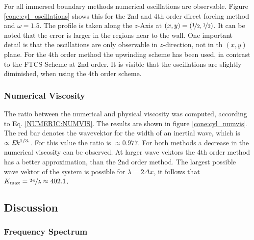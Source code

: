 For all immersed boundary methods numerical oscillations are observable.
Figure \ref{cone:cyl_oscillations} shows this for the 2nd and 4th order direct forcing method and $\omega=1.5$.
The profile is taken along the $z$-Axis at $(x,y)=(\nicefrac{1}{2},\nicefrac{1}{2})$.
It can be noted that the error is larger in the regions near to the wall.
One important detail is that the oscillations are only observable in $z$-direction, not
in th $(x,y)$ plane.
For the 4th order method the upwinding scheme has been used, in contrast to the FTCS-Scheme at 2nd order.
It is visible that the oscillations are slightly diminished, when using the 4th order scheme.

\subsubsection{Numerical Viscosity}

The ratio between the numerical and physical viscosity was computed, according to Eq. \ref{NUMERIC:NUMVIS}.
The results are shown in figure \ref{cone:cyl_numvis}.
The red bar denotes the wavevektor for the width of an inertial wave, which is $\propto \mbox{\textit{Ek}}^{1/3.}$.
For this value the ratio is $\approx{0.977}$.
For both methods a decrease in the numerical viscosity can  be observed.
At larger wave vektors the 4th order method has a better approximation, than the 2nd order method.
The largest possible wave vektor of the  system is possible for $\lambda = 2\Delta x$,
it follows that $K_{\text{max}} = \nicefrac{2\pi}{\lambda} \approx 402.1$.
\clearpage

\subsection{Discussion}

\subsubsection{Frequency Spectrum}

